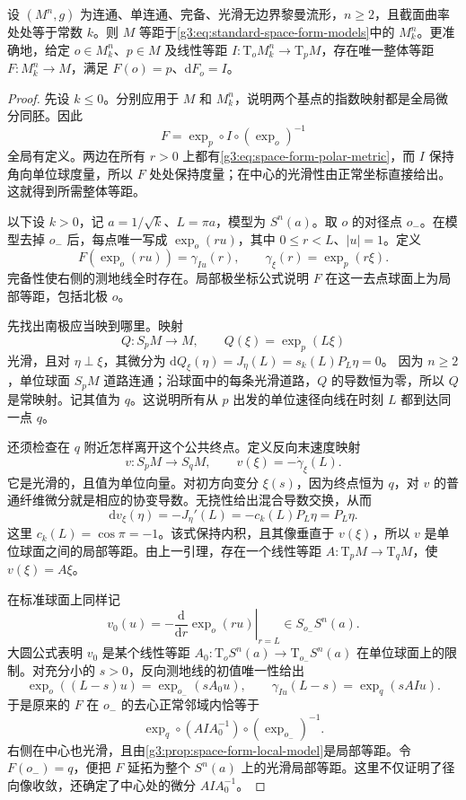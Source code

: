 \begin{theorem}\label{g3:thm:simply-connected-space-form}
	设 \((M^n,g)\) 为连通、单连通、完备、光滑无边界黎曼流形，\(n\ge2\)，且截面曲率处处等于常数 \(k\)。则 \(M\) 等距于\eqref{g3:eq:standard-space-form-models}中的 \(M_k^n\)。更准确地，给定 \(o\in M_k^n\)、\(p\in M\) 及线性等距 \(I:\mathrm T_oM_k^n\to\mathrm T_pM\)，存在唯一整体等距 \(F:M_k^n\to M\)，满足 \(F(o)=p\)、\(\mathrm dF_o=I\)。
\end{theorem}
\begin{proof}
	先设 \(k\le0\)。分别应用于 \(M\) 和 \(M_k^n\)，说明两个基点的指数映射都是全局微分同胚。因此
	\[
		F=\exp_p\circ I\circ(\exp_o)^{-1}
	\]
	全局有定义。两边在所有 \(r>0\) 上都有\eqref{g3:eq:space-form-polar-metric}，而 \(I\) 保持角向单位球度量，所以 \(F\) 处处保持度量；在中心的光滑性由正常坐标直接给出。这就得到所需整体等距。

	以下设 \(k>0\)，记 \(a=1/\sqrt{k}\)、\(L=\pi a\)，模型为 \(S^n(a)\)。取 \(o\) 的对径点 \(o_-\)。在模型去掉 \(o_-\) 后，每点唯一写成 \(\exp_o(ru)\)，其中 \(0\le r<L\)、\(|u|=1\)。定义
	\[
		F(\exp_o(ru))=\gamma_{Iu}(r),
		\qquad \gamma_\xi(r)=\exp_p(r\xi).
	\]
	完备性使右侧的测地线全时存在。局部极坐标公式说明 \(F\) 在这一去点球面上为局部等距，包括北极 \(o\)。

	先找出南极应当映到哪里。映射
	\[
		Q:S_pM\to M,\qquad Q(\xi)=\exp_p(L\xi)
	\]
	光滑，且对 \(\eta\perp\xi\)，其微分为
	\(\mathrm dQ_\xi(\eta)=J_\eta(L)=s_k(L)P_L\eta=0\)。
	因为 \(n\ge2\)，单位球面 \(S_pM\) 道路连通；沿球面中的每条光滑道路，\(Q\) 的导数恒为零，所以 \(Q\) 是常映射。记其值为 \(q\)。这说明所有从 \(p\) 出发的单位速径向线在时刻 \(L\) 都到达同一点 \(q\)。

	还须检查在 \(q\) 附近怎样离开这个公共终点。定义反向末速度映射
	\[
		v:S_pM\to S_qM,\qquad
		v(\xi)=-\dot\gamma_\xi(L).
	\]
	它是光滑的，且值为单位向量。对初方向变分 \(\xi(s)\)，因为终点恒为 \(q\)，对 \(v\) 的普通纤维微分就是相应的协变导数。无挠性给出混合导数交换，从而
	\[
		\mathrm dv_\xi(\eta)
		=-J_\eta'(L)
		=-c_k(L)P_L\eta
		=P_L\eta.
	\]
	这里 \(c_k(L)=\cos\pi=-1\)。该式保持内积，且其像垂直于 \(v(\xi)\)，所以 \(v\) 是单位球面之间的局部等距。由上一引理，存在一个线性等距
	\(A:\mathrm T_pM\to\mathrm T_qM\)，使 \(v(\xi)=A\xi\)。

	在标准球面上同样记
	\[
		v_0(u)=-\left.\frac{\mathrm d}{\mathrm dr}\exp_o(ru)\right|_{r=L}
		\in S_{o_-}S^n(a).
	\]
	大圆公式表明 \(v_0\) 是某个线性等距
	\(A_0:\mathrm T_oS^n(a)\to\mathrm T_{o_-}S^n(a)\)
	在单位球面上的限制。对充分小的 \(s>0\)，反向测地线的初值唯一性给出
	\[
		\exp_o((L-s)u)=\exp_{o_-}(sA_0u),
		\qquad
		\gamma_{Iu}(L-s)=\exp_q(sAIu).
	\]
	于是原来的 \(F\) 在 \(o_-\) 的去心正常邻域内恰等于
	\begin{equation}\label{g3:eq:space-form-antipodal-extension}
		\exp_q\circ(AIA_0^{-1})\circ(\exp_{o_-})^{-1}.
	\end{equation}
	右侧在中心也光滑，且由\cref{g3:prop:space-form-local-model}是局部等距。令 \(F(o_-)=q\)，便把 \(F\) 延拓为整个 \(S^n(a)\) 上的光滑局部等距。这里不仅证明了径向像收敛，还确定了中心处的微分 \(AIA_0^{-1}\)。


\end{proof}
